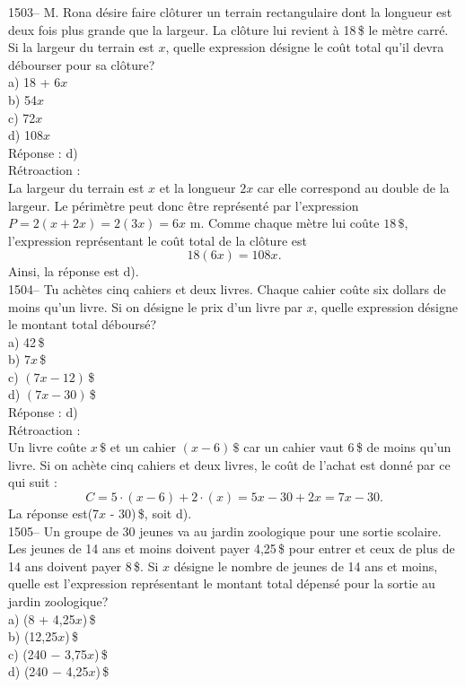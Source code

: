 1503-- M. Rona d\'esire faire cl\^oturer un terrain rectangulaire
dont la longueur est deux fois plus grande que la largeur. La
cl\^oture lui revient \`a 18\,\$ le m\`etre carr\'e. Si la largeur
du terrain est $x$, quelle expression d\'esigne le co\^ut total
qu'il devra d\'ebourser pour sa cl\^oture?\\
a) 18 + 6$x$\\
b) 54$x$\\
c) 72$x$\\
d) 108$x$\\

R\'eponse : d)\\

R\'etroaction :\\
La largeur du terrain est $x$ et la longueur $2x$ car elle
correspond au double de la largeur. Le p\'erim\`etre peut donc
\^etre repr\'esent\'e par l'expression $P=2(x+2x)=2(3x)=6x$ m. Comme
chaque m\`etre lui co\^ute $18\,\$$,
l'expression repr\'esentant le co\^ut total de la cl\^oture est
$$18(6x)=108x.$$ Ainsi, la r\'eponse est d).\\

1504-- Tu ach\`etes cinq cahiers et deux livres. Chaque cahier
co\^ute six dollars de moins qu'un livre. Si on d\'esigne le prix
d'un livre par $x$, quelle expression d\'esigne le montant total
d\'ebours\'e?\\
a) 42\,\$\\
b) $7x$\,\$\\
c) $(7x-12)$\,\$\\
d) $(7x-30)$\,\$\\

R\'eponse : d)\\

R\'etroaction :\\
Un livre co\^ute $x\,\$$ et un cahier $(x-6)\,\$$ car un cahier vaut
6\,\$ de moins qu'un livre. Si on ach\`ete cinq cahiers et deux
livres, le co\^ut de l'achat est donn\'e par ce qui suit :
$$C=5\cdot(x-6)+2\cdot(x)=5x-30+2x=7x-30.$$ La r\'eponse est(7$x$ - 30)\,\$,
soit d).\\

1505-- Un groupe de 30 jeunes va au jardin zoologique pour une sortie
scolaire. Les jeunes de 14 ans et moins doivent payer 4,25\,\$ pour
entrer et ceux de plus de 14 ans doivent payer 8\,\$. Si $x$
d\'esigne le nombre de jeunes de 14 ans et moins, quelle est
l'expression repr\'esentant le montant total
d\'epens\'e pour la sortie au jardin zoologique?\\
a) (8 + 4,25$x$)\,\$\\
b) (12,25$x$)\,\$\\
c) (240 $-$ 3,75$x$)\,\$\\
d) (240 $-$ 4,25$x$)\,\$\\

